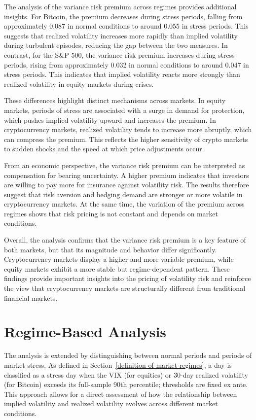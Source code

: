 \documentclass[11pt,a4paper,openany]{report}
\begin{document}
The analysis of the variance risk premium across regimes provides
additional insights. For Bitcoin, the premium decreases during stress
periods, falling from approximately 0.087 in normal conditions to around
0.055 in stress periods. This suggests that realized volatility
increases more rapidly than implied volatility during turbulent
episodes, reducing the gap between the two measures. In contrast, for
the S\&P 500, the variance risk premium increases during stress periods,
rising from approximately 0.032 in normal conditions to around 0.047 in
stress periods. This indicates that implied volatility reacts more
strongly than realized volatility in equity markets during crises.

These differences highlight distinct mechanisms across markets. In
equity markets, periods of stress are associated with a surge in demand
for protection, which pushes implied volatility upward and increases the
premium. In cryptocurrency markets, realized volatility tends to
increase more abruptly, which can compress the premium. This reflects
the higher sensitivity of crypto markets to sudden shocks and the speed
at which price adjustments occur.

From an economic perspective, the variance risk premium can be
interpreted as compensation for bearing uncertainty. A higher premium
indicates that investors are willing to pay more for insurance against
volatility risk. The results therefore suggest that risk aversion and
hedging demand are stronger or more volatile in cryptocurrency markets.
At the same time, the variation of the premium across regimes shows that
risk pricing is not constant and depends on market conditions.

Overall, the analysis confirms that the variance risk premium is a key
feature of both markets, but that its magnitude and behavior differ
significantly. Cryptocurrency markets display a higher and more variable
premium, while equity markets exhibit a more stable but regime-dependent
pattern. These findings provide important insights into the pricing of
volatility risk and reinforce the view that cryptocurrency markets are
structurally different from traditional financial markets.

\section{Regime-Based Analysis}\label{regime-based-analysis}

The analysis is extended by distinguishing between normal periods and
periods of market stress. As defined in
Section~\ref{definition-of-market-regimes}, a day is classified as a
stress day when the VIX (for equities) or 30-day realized volatility
(for Bitcoin) exceeds its full-sample 90th percentile; thresholds are
fixed ex ante. This approach allows for a direct assessment of how the
relationship between implied volatility and realized volatility evolves
across different market conditions.
\end{document}
